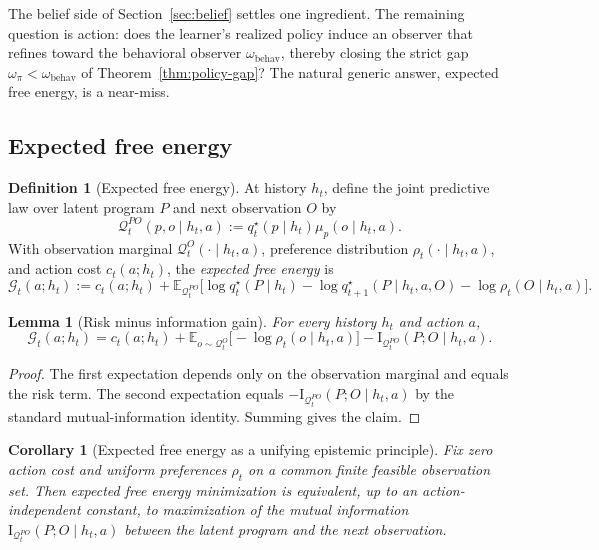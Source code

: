 \documentclass[11pt]{article}
\newtheorem{corollary}[theorem]{Corollary}
\newtheorem{lemma}[theorem]{Lemma}
\theoremstyle{definition}
\newtheorem{definition}[theorem]{Definition}
\theoremstyle{remark}
\newcommand{\Gcal}{\mathcal{G}}
\newcommand{\Qcal}{\mathcal{Q}}
\newcommand{\E}{\mathbb{E}}
\newcommand{\I}{\mathrm{I}}
\begin{document}
The belief side of Section~\ref{sec:belief} settles one ingredient. The remaining question is action: does the learner's realized policy induce an observer that refines toward the behavioral observer $\omega_{\mathrm{behav}}$, thereby closing the strict gap $\omega_\pi<\omega_{\mathrm{behav}}$ of Theorem~\ref{thm:policy-gap}? The natural generic answer, expected free energy, is a near-miss.

\subsection{Expected free energy}

\begin{definition}[Expected free energy]
\label{def:efe}
At history $h_t$, define the joint predictive law over latent program $P$ and next observation $O$ by
\[
\Qcal_t^{PO}(p,o\mid h_t,a):=q_t^\star(p\mid h_t)\mu_p(o\mid h_t,a).
\]
With observation marginal $\Qcal_t^O(\cdot\mid h_t,a)$, preference distribution $\rho_t(\cdot\mid h_t,a)$, and action cost $c_t(a;h_t)$, the \emph{expected free energy} is
\[
\Gcal_t(a;h_t)
:=
c_t(a;h_t)
+
\E_{\Qcal_t^{PO}}\!\bigl[\log q_t^\star(P\mid h_t)-\log q_{t+1}^\star(P\mid h_t,a,O)-\log\rho_t(O\mid h_t,a)\bigr].
\]
\end{definition}

\begin{lemma}[Risk minus information gain]
\label{lem:risk-ig}
For every history $h_t$ and action $a$,
\[
\Gcal_t(a;h_t)
=
c_t(a;h_t)
+\E_{o\sim\Qcal_t^O}\bigl[-\log\rho_t(o\mid h_t,a)\bigr]
-\I_{\Qcal_t^{PO}}(P;O\mid h_t,a).
\]
\end{lemma}

\begin{proof}
The first expectation depends only on the observation marginal and equals the risk term. The second expectation equals $-\I_{\Qcal_t^{PO}}(P;O\mid h_t,a)$ by the standard mutual-information identity. Summing gives the claim.
\end{proof}

\begin{corollary}[Expected free energy as a unifying epistemic principle]
\label{cor:efe-specialization}
Fix zero action cost and uniform preferences $\rho_t$ on a common finite feasible observation set. Then expected free energy minimization is equivalent, up to an action-independent constant, to maximization of the mutual information $\I_{\Qcal_t^{PO}}(P;O\mid h_t,a)$ between the latent program and the next observation.
\end{corollary}
\end{document}
